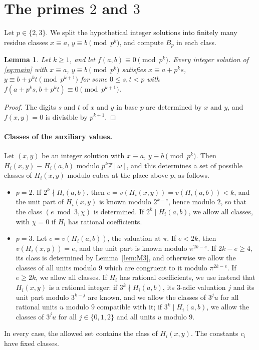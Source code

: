 \documentclass[11pt]{article}
\newtheorem{lemma}[theorem]{Lemma}
\newcommand{\Z}{\mathbb{Z}}
\begin{document}
\section{\texorpdfstring{The primes $2$ and $3$}{The primes 2 and 3}}\label{sec:local}

Let $p\in\{2,3\}$. We split the hypothetical integer solutions into finitely many residue classes $x\equiv a$, $y\equiv b\pmod{p^k}$, and compute $B_p$ in each class.

\begin{lemma}\label{lem:lifting}
Let $k\geq1$, and let $f(a,b)\equiv0\pmod{p^k}$. Every integer solution of \eqref{eq:main} with $x\equiv a$, $y\equiv b\pmod{p^k}$ satisfies $x\equiv a+p^ks$, $y\equiv b+p^kt\pmod{p^{k+1}}$ for some $0\le s,t<p$ with $f(a+p^ks,b+p^kt)\equiv0\pmod{p^{k+1}}$.
\end{lemma}

\begin{proof}
The digits $s$ and $t$ of $x$ and $y$ in base $p$ are determined by $x$ and $y$, and $f(x,y)=0$ is divisible by $p^{k+1}$.
\end{proof}

\paragraph{Classes of the auxiliary values.} Let $(x,y)$ be an integer solution with $x\equiv a$, $y\equiv b\pmod{p^k}$. Then $H_i(x,y)\equiv H_i(a,b)$ modulo $p^k\Z[\omega]$, and this determines a set of possible classes of $H_i(x,y)$ modulo cubes at the place above $p$, as follows.
\begin{itemize}
\item $p=2$. If $2^k\nmid H_i(a,b)$, then $e=v(H_i(x,y))=v(H_i(a,b))<k$, and the unit part of $H_i(x,y)$ is known modulo $2^{k-e}$, hence modulo $2$, so that the class $(e\bmod3,\chi)$ is determined. If $2^k\mid H_i(a,b)$, we allow all classes, with $\chi=0$ if $H_i$ has rational coefficients.
\item $p=3$. Let $e=v(H_i(a,b))$, the valuation at $\pi$. If $e<2k$, then $v(H_i(x,y))=e$, and the unit part is known modulo $\pi^{2k-e}$. If $2k-e\geq4$, its class is determined by Lemma~\ref{lem:M3}, and otherwise we allow the classes of all units modulo $9$ which are congruent to it modulo $\pi^{2k-e}$. If $e\geq2k$, we allow all classes. If $H_i$ has rational coefficients, we use instead that $H_i(x,y)$ is a rational integer: if $3^k\nmid H_i(a,b)$, its $3$-adic valuation $j$ and its unit part modulo $3^{k-j}$ are known, and we allow the classes of $3^ju$ for all rational units $u$ modulo $9$ compatible with it; if $3^k\mid H_i(a,b)$, we allow the classes of $3^ju$ for all $j\in\{0,1,2\}$ and all units $u$ modulo $9$.
\end{itemize}
In every case, the allowed set contains the class of $H_i(x,y)$. The constants $c_i$ have fixed classes.
\end{document}
